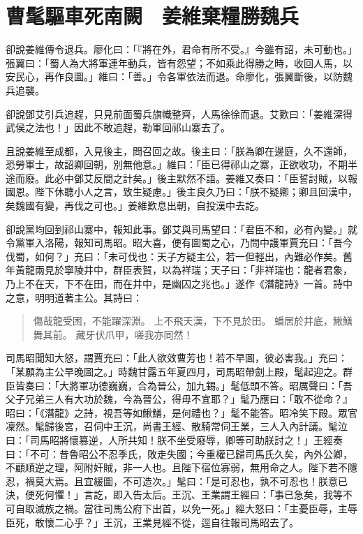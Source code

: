 
\chapter{曹髦驅車死南闕　姜維棄糧勝魏兵}

卻說姜維傳令退兵。廖化曰：「『將在外，君命有所不受。』今雖有詔，未可動也。」張翼曰：「蜀人為大將軍連年動兵，皆有怨望；不如乘此得勝之時，收回人馬，以安民心，再作良圖。」維曰：「善。」令各軍依法而退。命廖化，張翼斷後，以防魏兵追襲。

卻說鄧艾引兵追趕，只見前面蜀兵旗幟整齊，人馬徐徐而退。艾歎曰：「姜維深得武侯之法也！」因此不敢追趕，勒軍回祁山寨去了。

且說姜維至成都，入見後主，問召回之故。後主曰：「朕為卿在邊庭，久不還師，恐勞軍士，故詔卿回朝，別無他意。」維曰：「臣已得祁山之寨，正欲收功，不期半途而廢。此必中鄧艾反間之計矣。」後主默然不語。姜維又奏曰：「臣誓討賊，以報國恩。陛下休聽小人之言，致生疑慮。」後主良久乃曰：「朕不疑卿；卿且回漢中，矣魏國有變，再伐之可也。」姜維歎息出朝，自投漢中去訖。

卻說黨均回到祁山寨中，報知此事。鄧艾與司馬望曰：「君臣不和，必有內變。」就令黨軍入洛陽，報知司馬昭。昭大喜，便有圖蜀之心，乃問中護軍賈充曰：「吾今伐蜀，如何？」充曰：「未可伐也：天子方疑主公，若一但輕出，內難必作矣。舊年黃龍兩見於寧陵井中，群臣表賀，以為祥瑞；天子曰：「非祥瑞也：龍者君象，乃上不在天，下不在田，而在井中，是幽囚之兆也。」遂作《潛龍詩》一首。詩中之意，明明道著主公。其詩曰：

\begin{quote}
傷哉龍受困，不能躍深淵。
上不飛天漢，下不見於田。
蟠居於井底，鰍鱔舞其前。
藏牙伏爪甲，嗟我亦同然！
\end{quote}

司馬昭聞知大怒，謂賈充曰：「此人欲效曹芳也！若不早圖，彼必害我。」充曰：「某願為主公早晚圖之。」時魏甘露五年夏四月，司馬昭帶劍上殿，髦起迎之。群臣皆奏曰：「大將軍功德巍巍，合為晉公，加九錫。」髦低頭不答。昭厲聲曰：「吾父子兄弟三人有大功於魏，今為晉公，得毋不宜耶？」髦乃應曰：「敢不從命？』昭曰：「《潛龍》之詩，視吾等如鰍鱔，是何禮也？」髦不能答。昭冷笑下殿。眾官凜然。髦歸後宮，召伺中王沉，尚書王經、散騎常伺王業，三人入內計議。髦泣曰：「司馬昭將懷篡逆，人所共知！朕不坐受廢辱，卿等可助朕討之！」王經奏曰：「不可：昔魯昭公不忍季氏，敗走失國；今重權已歸司馬氏久矣，內外公卿，不顧順逆之理，阿附奸賊，非一人也。且陛下宿位寡弱，無用命之人。陛下若不隱忍，禍莫大焉。且宜緩圖，不可造次。」髦曰：「是可忍也，孰不可忍也！朕意已決，便死何懼！」言訖，即入告太后。王沉、王業謂王經曰：「事已急矣，我等不可自取滅族之禍。當往司馬公府下出首，以免一死。」經大怒曰：「主憂臣辱，主辱臣死，敢懷二心乎？」王沉，王業見經不從，逕自往報司馬昭去了。

